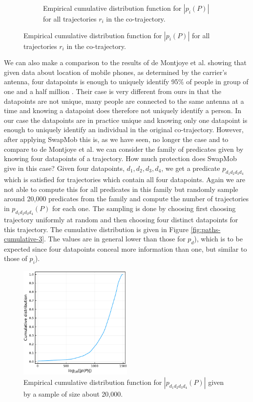 \documentclass[12pt]{article}
\newcommand{\data}{d}
\newcommand{\traj}{r}
\newcommand{\pred}{p}
\newcommand{\paths}{P}
\theoremstyle{definition}
\begin{document}
\begin{figure}
\begin{subfigure}[t]{0.49\textwidth}
    \caption{Empirical cumulative distribution function for
      \(|\pred_{i}(\paths)|\) for all trajectories \(\traj_{i}\) in
      the co-trajectory.}
    \label{fig:numpaths-startend-cumulative}
  \end{subfigure}
  \label{fig:numpaths-cumulative}
\end{figure}

We can also make a comparison to the results of de Montjoye et al.
showing that given data about location of mobile phones, as determined
by the carrier's antenna, four datapoints is enough to uniquely
identify 95\% of people in group of one and a half million
\cite{de_montjoye_unique_2013}. Their case is very different from ours
in that the datapoints are not unique, many people are connected to
the same antenna at a time and knowing a datapoint does therefore not
uniquely identify a person. In our case the datapoints are in practice
unique and knowing only one datapoint is enough to uniquely identify
an individual in the original co-trajectory. However, after applying
SwapMob this is, as we have seen, no longer the case and to compare to
de Montjoye et al. we can consider the family of predicates given by
knowing four datapoints of a trajectory. How much protection does
SwapMob give in this case? Given four datapoints,
\(\data_{1}, \data_{2}, \data_{3}, \data_{4}\), we get a predicate
\(\pred_{\data_{1}\data_{2}\data_{3}\data_{4}}\) which is satisfied
for trajectories which contain all four datapoints. Again we are not
able to compute this for all predicates in this family but randomly
sample around 20,000 predicates from the family and compute the number
of trajectories in
\(\pred_{\data_{1}\data_{2}\data_{3}\data_{4}}(\paths)\) for each one.
The sampling is done by choosing first choosing trajectory uniformly
at random and then choosing four distinct datapoints for this
trajectory. The cumulative distribution is given in Figure
\ref{fig:paths-cumulative-3}. The values are in general lower than
those for \(\pred_{d}\)), which is to be expected since four
datapoints conceal more information than one, but similar to those of
\(\pred_{i}\)).

\begin{figure}
  \centering
  \includegraphics[width=0.5\textwidth]{figures/numpaths_nmeasurements_cumulative.pdf}
  \caption{Empirical cumulative distribution function for
    \(|\pred_{\data_{1}\data_{2}\data_{3}\data_{4}}(\paths)|\) given
    by a sample of size about 20,000.}
  \label{fig:numpahts-nmeasurements-cumulative}
\end{figure}
\end{document}
